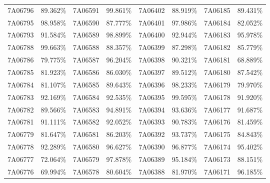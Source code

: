 \documentclass[12pt]{article}%
\begin{document}
\begin{longtable}{|cc|cc|cc|cc|}
7A06796              & 89.362\% & 7A06591              & 99.861\% & 7A06402              & 88.919\% & \multicolumn{1}{l}{7A06185             } & 89.431\% \\
7A06795              & 98.958\% & 7A06590              & 87.777\% & 7A06401              & 97.986\% & \multicolumn{1}{l}{7A06184             } & 82.052\% \\
7A06793              & 91.584\% & 7A06589              & 98.899\% & 7A06400              & 92.944\% & \multicolumn{1}{l}{7A06183             } & 95.978\% \\
7A06788              & 99.663\% & 7A06588              & 88.357\% & 7A06399              & 87.298\% & \multicolumn{1}{l}{7A06182             } & 85.779\% \\
7A06786              & 79.775\% & 7A06587              & 96.204\% & 7A06398              & 90.321\% & \multicolumn{1}{l}{7A06181             } & 68.889\% \\
7A06785              & 81.923\% & 7A06586              & 86.030\% & 7A06397              & 89.512\% & \multicolumn{1}{l}{7A06180             } & 87.542\% \\
7A06784              & 81.107\% & 7A06585              & 89.643\% & 7A06396              & 98.233\% & \multicolumn{1}{l}{7A06179             } & 79.970\% \\
7A06783              & 92.169\% & 7A06584              & 92.535\% & 7A06395              & 99.595\% & \multicolumn{1}{l}{7A06178             } & 91.920\% \\
7A06782              & 89.566\% & 7A06583              & 94.891\% & 7A06394              & 93.636\% & \multicolumn{1}{l}{7A06177             } & 91.687\% \\
7A06781              & 91.111\% & 7A06582              & 92.052\% & 7A06393              & 90.783\% & \multicolumn{1}{l}{7A06176             } & 81.459\% \\
7A06779              & 81.647\% & 7A06581              & 86.203\% & 7A06392              & 93.737\% & \multicolumn{1}{l}{7A06175             } & 84.843\% \\
7A06778              & 92.289\% & 7A06580              & 96.627\% & 7A06390              & 96.877\% & \multicolumn{1}{l}{7A06174             } & 95.402\% \\
7A06777              & 72.064\% & 7A06579              & 97.878\% & 7A06389              & 95.184\% & \multicolumn{1}{l}{7A06173             } & 88.151\% \\
7A06776              & 69.994\% & 7A06578              & 80.604\% & 7A06388              & 81.970\% & \multicolumn{1}{l}{7A06171             } & 96.185\% \\

\end{longtable}
\end{document}

